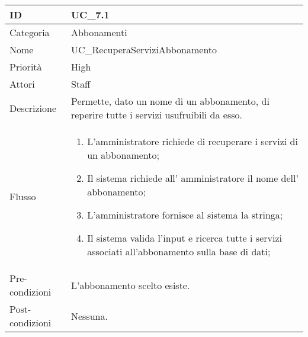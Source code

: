 \begin{center}
\begin{tabular}{ |p{2cm}|p{13cm}|  }
\hline
ID & UC\_7.1 \\\hline
Categoria & Abbonamenti\\\hline
Nome & UC\_RecuperaServiziAbbonamento\\\hline
Priorità & High \\\hline
Attori &  Staff \\\hline
Descrizione & Permette, dato un nome di  un abbonamento, di reperire tutte i servizi usufruibili da esso.\\\hline
Flusso &  	\begin{enumerate}
			\item L'amministratore richiede di recuperare i servizi di un abbonamento;
			\item Il sistema richiede all' amministratore il nome dell' abbonamento;
			\item L'amministratore fornisce al sistema la stringa;
			\item Il sistema valida l'input e ricerca tutte i servizi associati all'abbonamento sulla base di dati;
		\end{enumerate}\\\hline
Pre-condizioni &  L'abbonamento scelto esiste.\\\hline
Post-condizioni &  Nessuna.\\\hline
\end{tabular}
\label{table_use_case:7.1}\newline


\end{center}
